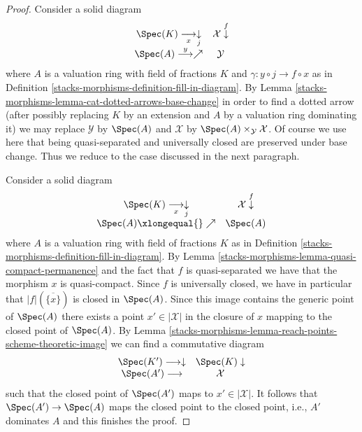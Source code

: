 \begin{proof}
Consider a solid diagram
$$
\begin{array}{cc}\Spec(K) \underset{x}{\longrightarrow}\underset{j}{\downarrow} & \mathcal{X} \overset{f}{\downarrow} \\ \Spec(A) \overset{y}{\longrightarrow}\nearrow & \mathcal{Y}\end{array}
$$
where $A$ is a valuation ring with field of fractions $K$
and $\gamma : y \circ j \longrightarrow f \circ x$ as in
Definition \ref{stacks-morphisms-definition-fill-in-diagram}. By
Lemma \ref{stacks-morphisms-lemma-cat-dotted-arrows-base-change}
in order to find a dotted arrow (after possibly replacing
$K$ by an extension and $A$ by a valuation ring dominating it)
we may replace $\mathcal{Y}$ by $\Spec(A)$ and $\mathcal{X}$
by $\Spec(A) \times_\mathcal{Y} \mathcal{X}$. Of course
we use here that being
quasi-separated and universally closed are preserved under base change.
Thus we reduce to the case discussed in the next paragraph.

\medskip\noindent
Consider a solid diagram
$$
\begin{array}{cc}\Spec(K) \underset{x}{\longrightarrow}\underset{j}{\downarrow} & \mathcal{X} \overset{f}{\downarrow} \\ \Spec(A) \xlongequal{}\nearrow & \Spec(A)\end{array}
$$
where $A$ is a valuation ring with field of fractions $K$ as in
Definition \ref{stacks-morphisms-definition-fill-in-diagram}.
By Lemma \ref{stacks-morphisms-lemma-quasi-compact-permanence} and the fact
that $f$ is quasi-separated we have that
the morphism $x$ is quasi-compact.
Since $f$ is universally closed, we have in particular
that $|f|(\overline{\{x\}})$ is closed in $\Spec(A)$.
Since this image contains the generic point of $\Spec(A)$
there exists a point $x' \in |\mathcal{X}|$ in the closure
of $x$ mapping to the closed point of $\Spec(A)$.
By Lemma \ref{stacks-morphisms-lemma-reach-points-scheme-theoretic-image}
we can find a commutative diagram
$$
\begin{array}{cc}\Spec(K') \longrightarrow\downarrow & \Spec(K) \downarrow \\ \Spec(A') \longrightarrow & \mathcal{X}\end{array}
$$
such that the closed point of $\Spec(A')$ maps to $x' \in |\mathcal{X}|$.
It follows that $\Spec(A') \to \Spec(A)$ maps the closed point
to the closed point, i.e., $A'$ dominates $A$ and this finishes the proof.
\end{proof}

